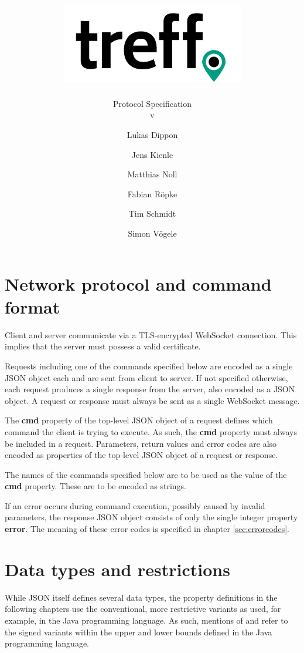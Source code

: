 \documentclass[parskip=full,11pt]{scrartcl}
\title{\includegraphics[width = 80mm]{images/logo_crop.png}}
\subtitle{\huge Protocol Specification\\
          v\protocolversion}
\author{Lukas Dippon
        \and Jens Kienle
        \and Matthias Noll
        \and Fabian Röpke
        \and Tim Schmidt
        \and Simon Vögele}
\begin{document}
\maketitle
\thispagestyle{empty} %

\pagebreak
\tableofcontents

\pagebreak
\section{Network protocol and command format}
Client and server communicate via a TLS-encrypted WebSocket connection.
This implies that the server must possess a valid certificate.

Requests including one of the commands specified below are encoded as a single
JSON object each and are sent from client to server.
If not specified otherwise, each request produces a single response from the
server, also encoded as a JSON object.
A request or response must always be sent as a single WebSocket message.

The \textbf{cmd} property of the top-level JSON object of a request defines
which command the client is trying to execute.
As such, the \textbf{cmd} property must always be included in a request.
Parameters, return values and error codes are also encoded as properties of
the top-level JSON object of a request or response.

The names of the commands specified below are to be used as the value of the
\textbf{cmd} property.
These are to be encoded as strings.

If an error occurs during command execution, possibly caused by invalid
parameters, the response JSON object consists of only the single integer
property \textbf{error}.
The meaning of these error codes is specified in chapter \ref{sec:errorcodes}.

\section{Data types and restrictions}\label{sec:datatypes}
While JSON itself defines several data types, the property
definitions in the following chapters use the conventional, more restrictive
variants as used, for example, in the Java programming language.
As such, mentions of  and  refer to the signed variants
within the upper and lower bounds defined in the Java programming language.
\end{document}
